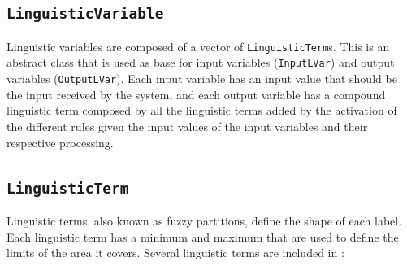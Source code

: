 		\subsection{\texttt{LinguisticVariable}}
			Linguistic variables are composed of a vector of \texttt{LinguisticTerm}s. This is an abstract class that is used as base for input variables (\texttt{InputLVar}) and output variables (\texttt{OutputLVar}). Each input variable has an input value that should be the input received by the system, and each output variable has a compound linguistic term composed by all the linguistic terms added by the activation of the different rules given the input values of the input variables and their respective processing.
			
		\subsection{\texttt{LinguisticTerm}}
			Linguistic terms, also known as fuzzy partitions, define the shape of each label. Each linguistic term has a minimum and maximum that are used to define the limits of the area it covers. Several linguistic terms are included in \fl:

